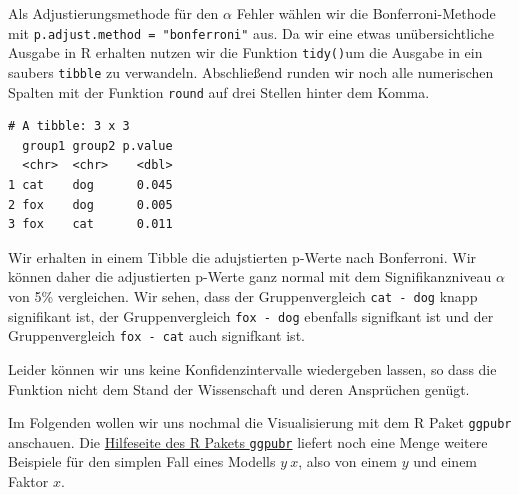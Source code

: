 \documentclass[
  letterpaper,
]{scrbook}
\newenvironment{Shaded}{\begin{snugshade}}{\end{snugshade}}
\newcommand{\AttributeTok}[1]{\textcolor[rgb]{0.40,0.45,0.13}{#1}}
\newcommand{\DecValTok}[1]{\textcolor[rgb]{0.68,0.00,0.00}{#1}}
\newcommand{\FunctionTok}[1]{\textcolor[rgb]{0.28,0.35,0.67}{#1}}
\newcommand{\NormalTok}[1]{\textcolor[rgb]{0.00,0.23,0.31}{#1}}
\newcommand{\SpecialCharTok}[1]{\textcolor[rgb]{0.37,0.37,0.37}{#1}}
\newcommand{\StringTok}[1]{\textcolor[rgb]{0.13,0.47,0.30}{#1}}
\begin{document}

Als Adjustierungsmethode für den \(\alpha\) Fehler wählen wir die
Bonferroni-Methode mit \texttt{p.adjust.method\ =\ "bonferroni"} aus. Da
wir eine etwas unübersichtliche Ausgabe in R erhalten nutzen wir die
Funktion \texttt{tidy()}um die Ausgabe in ein saubers \texttt{tibble} zu
verwandeln. Abschließend runden wir noch alle numerischen Spalten mit
der Funktion \texttt{round} auf drei Stellen hinter dem Komma.

\begin{Shaded}
\end{Shaded}

\begin{verbatim}
# A tibble: 3 x 3
  group1 group2 p.value
  <chr>  <chr>    <dbl>
1 cat    dog      0.045
2 fox    dog      0.005
3 fox    cat      0.011
\end{verbatim}

Wir erhalten in einem Tibble die adujstierten p-Werte nach Bonferroni.
Wir können daher die adjustierten p-Werte ganz normal mit dem
Signifikanzniveau \(\alpha\) von 5\% vergleichen. Wir sehen, dass der
Gruppenvergleich \texttt{cat\ -\ dog} knapp signifikant ist, der
Gruppenvergleich \texttt{fox\ -\ dog} ebenfalls signifkant ist und der
Gruppenvergleich \texttt{fox\ -\ cat} auch signifkant ist.

Leider können wir uns keine Konfidenzintervalle wiedergeben lassen, so
dass die Funktion nicht dem Stand der Wissenschaft und deren Ansprüchen
genügt.

Im Folgenden wollen wir uns nochmal die Visualisierung mit dem R Paket
\texttt{ggpubr} anschauen. Die
\href{https://rpkgs.datanovia.com/ggpubr/index.html}{Hilfeseite des R
Pakets \texttt{ggpubr}} liefert noch eine Menge weitere Beispiele für
den simplen Fall eines Modells \(y ~ x\), also von einem \(y\) und einem
Faktor \(x\).
\end{document}
